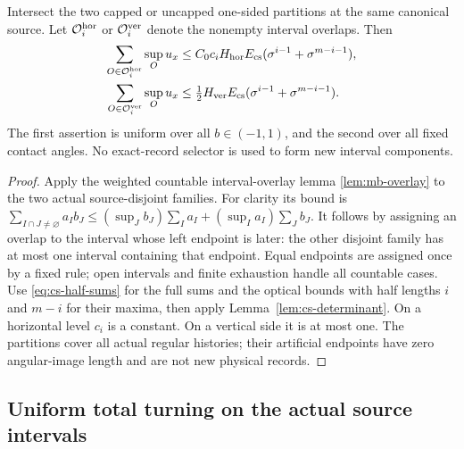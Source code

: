 \begin{corollary}
\label{cor:cs-overlap}
Intersect the two capped or uncapped one-sided partitions at the
same canonical source.  Let $\mathcal O_i^{\rm hor}$ or
$\mathcal O_i^{\rm ver}$ denote the nonempty interval overlaps.
Then
\begin{align}
 \sum_{O\in\mathcal O_i^{\rm hor}}\sup_O u_x
   &\le C_0c_i H_{\rm hor}E_{\rm cs}
                    (\sigma^{i-1}+\sigma^{m-i-1}),
                                                        \label{eq:cs-overlap-h}\\
 \sum_{O\in\mathcal O_i^{\rm ver}}\sup_O u_x
   &\le\tfrac12H_{\rm ver}E_{\rm cs}
                    (\sigma^{i-1}+\sigma^{m-i-1}).
                                                        \label{eq:cs-overlap-v}
\end{align}
The first assertion is uniform over all $b\in(-1,1)$, and the
second over all fixed contact angles.  No exact-record selector is
used to form new interval components.
\end{corollary}
\begin{proof}
Apply the weighted countable interval-overlay lemma
\ref{lem:mb-overlay} to the two actual source-disjoint families.
For clarity its bound is
$\sum_{I\cap J\ne\varnothing}a_Ib_J
 \le(\sup_Jb_J)\sum_Ia_I+(\sup_Ia_I)\sum_Jb_J$.
It follows by assigning an overlap to the interval whose left endpoint
is later: the other disjoint family has at most one interval containing
that endpoint.  Equal endpoints are assigned once by a fixed rule;
open intervals and finite exhaustion handle all countable cases.
Use \eqref{eq:cs-half-sums} for the full sums and the optical bounds
with half lengths $i$ and $m-i$ for their maxima, then apply
Lemma~\ref{lem:cs-determinant}.  On a horizontal level $c_i$ is a
constant.  On a vertical side it is at most one.  The partitions
cover all actual regular histories; their artificial endpoints have
zero angular-image length and are not new physical records.
\end{proof}

\subsection{Uniform total turning on the actual source intervals}

